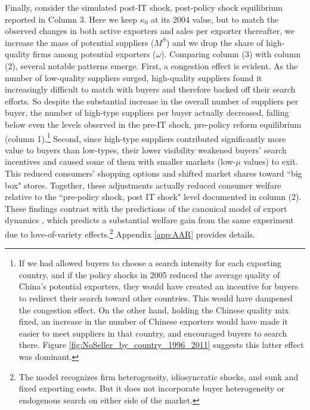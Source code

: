 \documentclass[12pt]{article} \usepackage{amsmath,amssymb,amsthm,geometry,graphicx,setspace,algorithm,algpseudocode,float}
\begin{document}
Finally, consider the simulated post-IT shock, post-policy shock equilibrium reported in Column 3. Here we keep $\kappa_0$ at its 2004 value, but to match the observed changes in both active exporters and sales per exporter thereafter, we increase the mass of potential suppliers ($M^S$) and we drop the share of high-quality firms among potential exporters ($\omega$). Comparing column (3) with column (2), several notable patterns emerge. First, a congestion effect is evident. As the number of low-quality suppliers surged, high-quality suppliers found it increasingly difficult to match with buyers and therefore backed off their search efforts.  So despite the substantial increase in the overall number of suppliers per buyer, the number of high-type suppliers per buyer actually decreased, falling below even the levels observed in the  pre-IT shock, pre-policy reform equilibrium (column 1).\footnote{\label{fn:random_search} If we had allowed buyers to choose a search intensity for each exporting country, and if the policy shocks in 2005 reduced the average quality of  China's potential exporters, they would have created an incentive for buyers to redirect their search toward other countries. This would have dampened the congestion effect. On the other hand, holding the Chinese quality mix fixed, an increase in the number of Chinese exporters would have made it easier to meet suppliers in that country, and encouraged buyers to search there. Figure \ref{fig:NoSeller_by_country_1996_2011} suggests this latter effect was dominant.\medskip} Second, since high-type suppliers contributed significantly more value to buyers than low-types, their lower visibility weakened buyers' search incentives and caused some of them with smaller markets (low-$\mu$ values) to exit. This reduced consumers' shopping options and shifted market shares toward ``big box" stores. Together, these adjustments actually reduced consumer welfare relative to the ``pre-policy shock, post IT shock" level documented in column (2). These findings  contrast with the predictions of the canonical model of export dynamics \citep{AlessandriaArkolakisRuhl2020}, which predicts a substantial welfare gain from the same experiment due to love-of-variety effects.\footnote{The \citet{AlessandriaArkolakisRuhl2020} model recognizes firm heterogeneity, idiosyncratic shocks, and sunk and fixed exporting costs. But it does not incorporate buyer heterogeneity or endogenous search on either side of the market.\medskip} Appendix \ref{app:AAR} provides details.
\par
\end{document}
